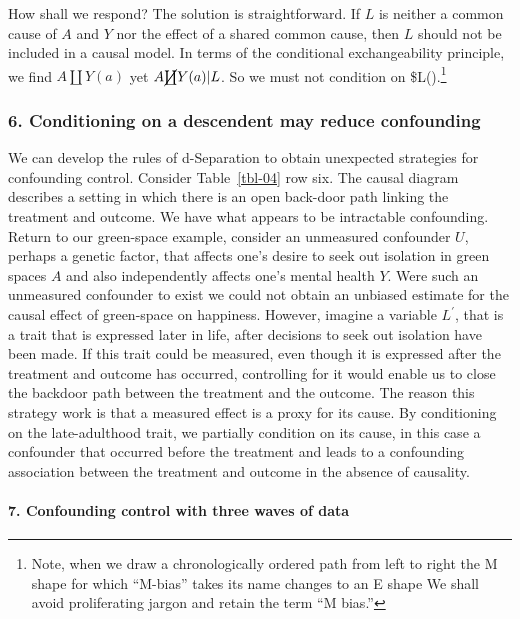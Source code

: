 \documentclass[
  singlecolumn]{article}
\let\oldparagraph\paragraph
\renewcommand{\paragraph}[1]{\oldparagraph{#1}\mbox{}}
\begin{document}
How shall we respond? The solution is straightforward. If \(L\) is
neither a common cause of \(A\) and \(Y\) nor the effect of a shared
common cause, then \(L\) should not be included in a causal model. In
terms of the conditional exchangeability principle, we find
\(A \coprod Y(a)\) yet \(A \cancel{\coprod} Y(a)| L\). So we must not
condition on \$L().\footnote{Note, when we draw a chronologically ordered path from
  left to right the M shape for which ``M-bias'' takes its name changes
  to an E shape We shall avoid proliferating jargon and retain the term
  ``M bias.''}

\subsubsection{6. Conditioning on a descendent may reduce
confounding}\label{conditioning-on-a-descendent-may-reduce-confounding}

We can develop the rules of d-Separation to obtain unexpected strategies
for confounding control. Consider Table~\ref{tbl-04} row six. The causal
diagram describes a setting in which there is an open back-door path
linking the treatment and outcome. We have what appears to be
intractable confounding. Return to our green-space example, consider an
unmeasured confounder \(U\), perhaps a genetic factor, that affects
one's desire to seek out isolation in green spaces \(A\) and also
independently affects one's mental health \(Y\). Were such an unmeasured
confounder to exist we could not obtain an unbiased estimate for the
causal effect of green-space on happiness. However, imagine a variable
\(L^\prime\), that is a trait that is expressed later in life, after
decisions to seek out isolation have been made. If this trait could be
measured, even though it is expressed after the treatment and outcome
has occurred, controlling for it would enable us to close the backdoor
path between the treatment and the outcome. The reason this strategy
work is that a measured effect is a proxy for its cause. By conditioning
on the late-adulthood trait, we partially condition on its cause, in
this case a confounder that occurred before the treatment and leads to a
confounding association between the treatment and outcome in the absence
of causality.

\paragraph{7. Confounding control with three waves of
data}\label{confounding-control-with-three-waves-of-data}
\end{document}
